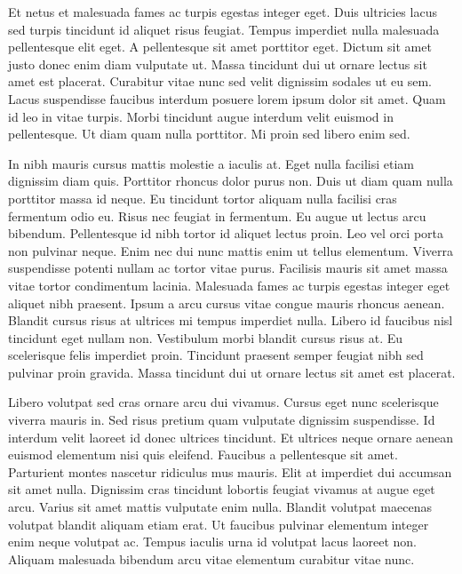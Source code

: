 \documentclass[11pt,a4paper]{article}
\begin{document}
Et netus et malesuada fames ac turpis egestas integer eget. Duis ultricies lacus sed turpis tincidunt id aliquet risus feugiat. Tempus imperdiet nulla malesuada pellentesque elit eget. A pellentesque sit amet porttitor eget. Dictum sit amet justo donec enim diam vulputate ut. Massa tincidunt dui ut ornare lectus sit amet est placerat. Curabitur vitae nunc sed velit dignissim sodales ut eu sem. Lacus suspendisse faucibus interdum posuere lorem ipsum dolor sit amet. Quam id leo in vitae turpis. Morbi tincidunt augue interdum velit euismod in pellentesque. Ut diam quam nulla porttitor. Mi proin sed libero enim sed.

In nibh mauris cursus mattis molestie a iaculis at. Eget nulla facilisi etiam dignissim diam quis. Porttitor rhoncus dolor purus non. Duis ut diam quam nulla porttitor massa id neque. Eu tincidunt tortor aliquam nulla facilisi cras fermentum odio eu. Risus nec feugiat in fermentum. Eu augue ut lectus arcu bibendum. Pellentesque id nibh tortor id aliquet lectus proin. Leo vel orci porta non pulvinar neque. Enim nec dui nunc mattis enim ut tellus elementum. Viverra suspendisse potenti nullam ac tortor vitae purus. Facilisis mauris sit amet massa vitae tortor condimentum lacinia. Malesuada fames ac turpis egestas integer eget aliquet nibh praesent. Ipsum a arcu cursus vitae congue mauris rhoncus aenean. Blandit cursus risus at ultrices mi tempus imperdiet nulla. Libero id faucibus nisl tincidunt eget nullam non. Vestibulum morbi blandit cursus risus at. Eu scelerisque felis imperdiet proin. Tincidunt praesent semper feugiat nibh sed pulvinar proin gravida. Massa tincidunt dui ut ornare lectus sit amet est placerat.

Libero volutpat sed cras ornare arcu dui vivamus. Cursus eget nunc scelerisque viverra mauris in. Sed risus pretium quam vulputate dignissim suspendisse. Id interdum velit laoreet id donec ultrices tincidunt. Et ultrices neque ornare aenean euismod elementum nisi quis eleifend. Faucibus a pellentesque sit amet. Parturient montes nascetur ridiculus mus mauris. Elit at imperdiet dui accumsan sit amet nulla. Dignissim cras tincidunt lobortis feugiat vivamus at augue eget arcu. Varius sit amet mattis vulputate enim nulla. Blandit volutpat maecenas volutpat blandit aliquam etiam erat. Ut faucibus pulvinar elementum integer enim neque volutpat ac. Tempus iaculis urna id volutpat lacus laoreet non. Aliquam malesuada bibendum arcu vitae elementum curabitur vitae nunc.
\end{document}
